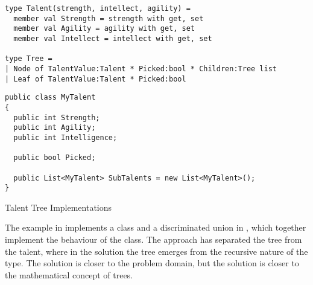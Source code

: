 \begin{listing}[H]
  \begin{verbatim}
type Talent(strength, intellect, agility) =
  member val Strength = strength with get, set
  member val Agility = agility with get, set
  member val Intellect = intellect with get, set

type Tree =
| Node of TalentValue:Talent * Picked:bool * Children:Tree list
| Leaf of TalentValue:Talent * Picked:bool
  \end{verbatim}
  \begin{verbatim}
public class MyTalent
{
  public int Strength;
  public int Agility;
  public int Intelligence;

  public bool Picked;

  public List<MyTalent> SubTalents = new List<MyTalent>();
}
  \end{verbatim}
  \caption{Talent Tree Implementations}
  \label{lst:tree-imps}
\end{listing}

The example in  implements a class and a discriminated union in \fs, which together implement the behaviour of the \cs class. The \fs approach has separated the tree from the talent, where in the  \cs solution the tree emerges from the recursive nature of the type. The \cs solution is closer to the problem domain, but the \fs solution is closer to the mathematical concept of trees.
